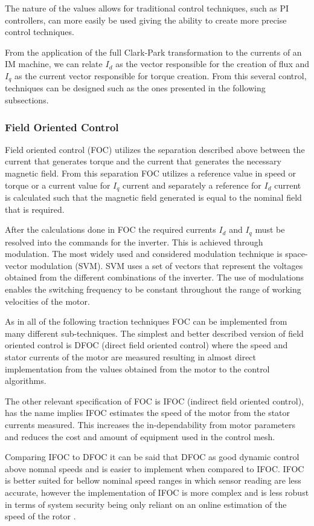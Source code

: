 The nature of the values allows for traditional control techniques, such as PI controllers, can more easily be used giving the ability to create more precise control techniques.

From the application of the full Clark-Park transformation to the currents of an IM machine, we can relate $I_d$ as the vector responsible for the creation of flux and $I_q$ as the current vector responsible for torque creation. From this several control, techniques can be designed such as the ones presented in the following subsections.

\subsubsection{Field Oriented Control}
Field oriented control (FOC) utilizes the separation described above between the current that generates torque and the current that generates the necessary magnetic field. From this separation FOC utilizes a reference value in speed or torque or a current value for $I_q$ current and separately a reference for $I_d$ current is calculated such that the magnetic field generated is equal to the nominal field that is required.

After the calculations done in FOC the required currents $I_d$ and $I_q$ must be resolved into the commands for the inverter. This is achieved through modulation. The most widely used and considered modulation technique is space-vector modulation (SVM). SVM uses a set of vectors that represent the voltages obtained from the different combinations of the inverter. The use of modulations enables the switching frequency to be constant throughout the range of working velocities of the motor.

As in all of the following traction techniques FOC can be implemented from many different sub-techniques. The simplest and better described version of field oriented control is DFOC (direct field oriented control) where the speed and stator currents of the motor are measured resulting in almost direct implementation from the values obtained from the motor to the control algorithms. 

The other relevant specification of FOC is IFOC (indirect field oriented control), has the name implies IFOC estimates the speed of the motor from the stator currents measured. This increases the in-dependability from motor parameters and reduces the cost and amount of equipment used in the control mesh.

Comparing IFOC to DFOC it can be said that DFOC as good dynamic control above nomnal speeds and is easier to implement when compared to IFOC. IFOC is better suited for bellow nominal speed ranges in which sensor reading are less accurate, however the implementation of IFOC is more complex and is less robust in terms of system security being only reliant on an online estimation of the speed of the rotor \cite{DFOC-IFOC}. 

